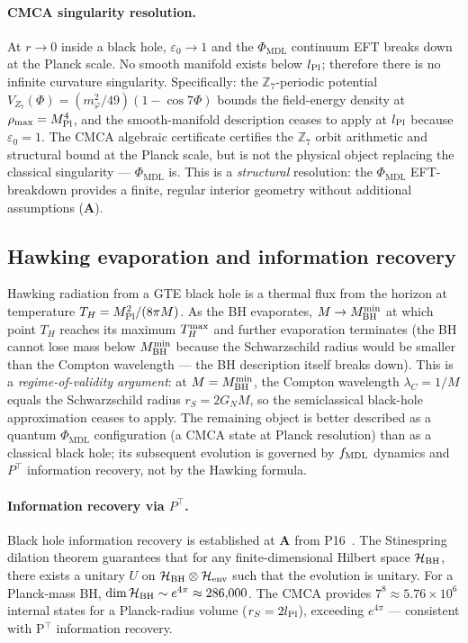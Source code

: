 \documentclass[11pt]{article}
\theoremstyle{remark}
\newcommand{\PHIMDL}{\Phi_{\mathrm{MDL}}}
\newcommand{\ZS}{\mathbb{Z}_7}
\newcommand{\fmdl}{f_{\rm MDL}}
\newcommand{\CatA}{\textbf{A}}
\begin{document}
\paragraph{CMCA singularity resolution.}
At $r\to0$ inside a black hole, $\varepsilon_0\to1$ and the $\PHIMDL$ continuum
EFT breaks down at the Planck scale.  No smooth manifold exists below $l_{\rm Pl}$;
therefore there is no infinite curvature singularity.  Specifically: the
$\ZS$-periodic potential $V_{Z_7}(\Phi) = (m_\varphi^2/49)(1-\cos 7\Phi)$ bounds
the field-energy density at $\rho_{\rm max} = M_{\rm Pl}^4$, and the smooth-manifold
description ceases to apply at $l_{\rm Pl}$ because $\varepsilon_0=1$.  The CMCA
algebraic certificate certifies the $\ZS$ orbit arithmetic and structural bound at
the Planck scale, but is not the physical object replacing the classical
singularity --- $\PHIMDL$ is.  This is a \emph{structural} resolution: the
$\PHIMDL$ EFT-breakdown provides a finite, regular interior geometry without
additional assumptions ($\CatA$).

\subsection{Hawking evaporation and information recovery}

Hawking radiation from a GTE black hole is a thermal flux from the horizon at
temperature $T_H = M_{\rm Pl}^2/(8\pi M)$.  As the BH evaporates,
$M\to M_{\rm BH}^{\rm min}$ at which point $T_H$ reaches its maximum $T_H^{\rm max}$
and further evaporation terminates (the BH cannot lose mass below $M_{\rm BH}^{\rm min}$
because the Schwarzschild radius would be smaller than the Compton wavelength ---
the BH description itself breaks down).
This is a \emph{regime-of-validity argument}: at $M = M_{\rm BH}^{\rm min}$, the
Compton wavelength $\lambda_C = 1/M$ equals the Schwarzschild radius $r_S = 2G_N M$,
so the semiclassical black-hole approximation ceases to apply.
The remaining object is better described as a quantum $\PHIMDL$ configuration
(a CMCA state at Planck resolution) than as a classical black hole; its subsequent
evolution is governed by $\fmdl$ dynamics and $P^\top$ information recovery, not by
the Hawking formula.

\paragraph{Information recovery via $P^\top$.}
Black hole information recovery is established at $\CatA$ from P16~\cite{SpivackBHUnitarity}.
The Stinespring dilation theorem guarantees that for any finite-dimensional Hilbert
space $\mathcal{H}_{\rm BH}$, there exists a unitary $U$ on
$\mathcal{H}_{\rm BH}\otimes\mathcal{H}_{\rm env}$ such that the evolution
is unitary.  For a Planck-mass BH, $\dim\mathcal{H}_{\rm BH}\sim e^{4\pi}
\approx 286{,}000$.  The CMCA provides $7^8 \approx 5.76\times10^6$ internal
states for a Planck-radius volume ($r_S = 2l_{\rm Pl}$), exceeding
$e^{4\pi}$ --- consistent with P$^\top$ information recovery.
\end{document}
